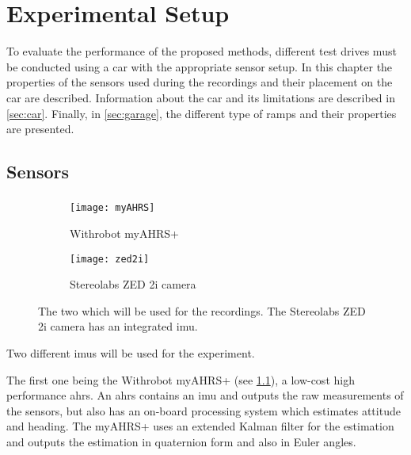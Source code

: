 \chapter{Experimental Setup}
\label{ch:ExperimentalSetup}

To evaluate the performance of the proposed methods, different test drives must be conducted using a car with the appropriate sensor setup.
In this chapter the properties of the sensors used during the recordings and their placement on the car are described.
Information about the car and its limitations are described in \cref{sec:car}.
Finally, in \cref{sec:garage}, the different type of ramps and their properties are presented.


\section{Sensors}
\subsection{}
\begin{figure}[htb]
    \centering
    \begin{subfigure}[b]{0.4\textwidth}
        \centering
        \texttt{[image: myAHRS]}
        \caption{Withrobot myAHRS+~\cite{Withrobot2017}}
        \label{fig:imu_myahrs}
    \end{subfigure}
    \begin{subfigure}[b]{0.4\textwidth}
        \centering
        \texttt{[image: zed2i]}
        \caption{Stereolabs ZED 2i camera~\cite{Stereolabs2019}}
        \label{fig:imu_zed}
    \end{subfigure}
    \caption[ used in the experiment]{The two  which will be used for the recordings. The Stereolabs ZED 2i camera has an integrated \acrshort{imu}.}
    \label{fig:imus_used}
\end{figure}
Two different \glspl{imu} will be used for the experiment.

The first one being the Withrobot myAHRS+ (see \cref{fig:imu_myahrs}), a low-cost high performance \gls{ahrs}.
An \gls{ahrs} contains an \gls{imu} and outputs the raw measurements of the sensors, but also has an on-board processing system which estimates attitude and heading.
The myAHRS+ uses an extended Kalman filter for the estimation and outputs the estimation in quaternion form and also in Euler angles.

